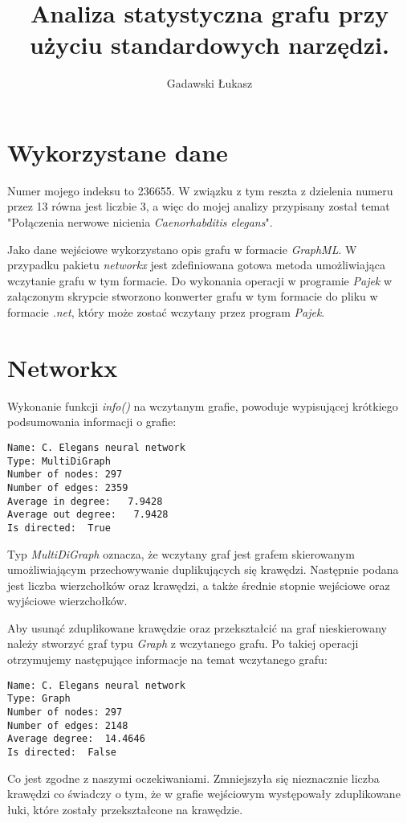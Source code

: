 \documentclass[10pt,a4paper]{article}
\author{Gadawski Łukasz}
\title{Analiza statystyczna grafu przy użyciu standardowych narzędzi.}
\begin{document}
\maketitle

\section{Wykorzystane dane}
Numer mojego indeksu to 236655. W związku z tym reszta z dzielenia numeru przez 13 równa jest liczbie 3, a więc do mojej analizy przypisany został temat "Połączenia nerwowe nicienia \textit{Caenorhabditis elegans}".

Jako dane wejściowe wykorzystano opis grafu w formacie \textit{GraphML}. W przypadku pakietu \textit{networkx} jest zdefiniowana gotowa metoda umożliwiająca wczytanie grafu w tym formacie. Do wykonania operacji w programie \textit{Pajek} w załączonym skrypcie stworzono konwerter grafu w tym formacie do pliku w formacie \textit{.net}, który może zostać wczytany przez program \textit{Pajek}.

\section{Networkx}
Wykonanie funkcji \textit{info()} na wczytanym grafie, powoduje wypisującej krótkiego podsumowania informacji o grafie:

\begin{verbatim}
Name: C. Elegans neural network
Type: MultiDiGraph
Number of nodes: 297
Number of edges: 2359
Average in degree:   7.9428
Average out degree:   7.9428
Is directed:  True
\end{verbatim}

Typ \textit{MultiDiGraph} oznacza, że wczytany graf jest grafem skierowanym umożliwiającym przechowywanie duplikujących się krawędzi. Następnie podana jest liczba wierzchołków oraz krawędzi, a także średnie stopnie wejściowe oraz wyjściowe wierzchołków.

Aby usunąć zduplikowane krawędzie oraz przekształcić na graf nieskierowany należy stworzyć graf typu \textit{Graph} z wczytanego grafu. Po takiej operacji otrzymujemy następujące informacje na temat wczytanego grafu:

\begin{verbatim}
Name: C. Elegans neural network
Type: Graph
Number of nodes: 297
Number of edges: 2148
Average degree:  14.4646
Is directed:  False
\end{verbatim}

Co jest zgodne z naszymi oczekiwaniami. Zmniejszyła się nieznacznie liczba krawędzi co świadczy o tym, że w grafie wejściowym występowały zduplikowane łuki, które zostały przekształcone na krawędzie.
\end{document}
